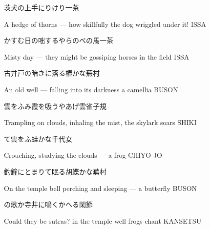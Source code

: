 \begin{haiku}
    {\FH 茨犬の上手にりけり}\hfill{\FH 一茶}

    \vin{} A hedge of thorns ---
    \vin{} \vin{} how skillfully the dog
    \vin{} \vin{} \vin{} wriggled under it! \hspace{\fill} ISSA
\end{haiku}

\begin{haiku}
    {\FH かすむ日の咄するやらのべの馬}\hfill{\FH 一茶}

    \vin{} Misty day ---
    \vin{} \vin{} they might be gossiping
    \vin{} \vin{} \vin{} horses in the field \hspace{\fill} ISSA
\end{haiku}

\begin{haiku}
    {\FH 古井戸の暗きに落る椿かな}\hfill{\FH 蕪村}

    \vin{} An old well ---
    \vin{} \vin{} falling into its darkness
    \vin{} \vin{} \vin{} a camellia \hspace{\fill} BUSON
\end{haiku}

\begin{haiku}
    {\FH 雲をふみ霞を吸うやあげ雲雀}\hfill{\FH 子規}

    \vin{} Trampling on clouds,
    \vin{} \vin{} inhaling the mist,
    \vin{} \vin{} \vin{} the skylark soars \hspace{\fill} SHIKI
\end{haiku}

\begin{haiku}
    {\FH {}て雲をふ蛙かな}\hfill{\FH 千代女}

    \vin{} Crouching,
    \vin{} \vin{} studying the clouds ---
    \vin{} \vin{} \vin{} a frog \hspace{\fill} CHIYO-JO
\end{haiku}

\begin{haiku}
    {\FH 釣鐘にとまりて眠る胡蝶かな}\hfill{\FH 蕪村}

    \vin{} On the temple bell
    \vin{} \vin{} perching and sleeping ---
    \vin{} \vin{} \vin{} a butterfly \hspace{\fill} BUSON
\end{haiku}

\begin{haiku}
    {\FH {}の歌か寺井に鳴くかへる}\hfill{\FH 閑節}

    \vin{} Could they be sutras?
    \vin{} \vin{} in the temple well
    \vin{} \vin{} \vin{} frogs chant \hspace{\fill} KANSETSU
\end{haiku}

